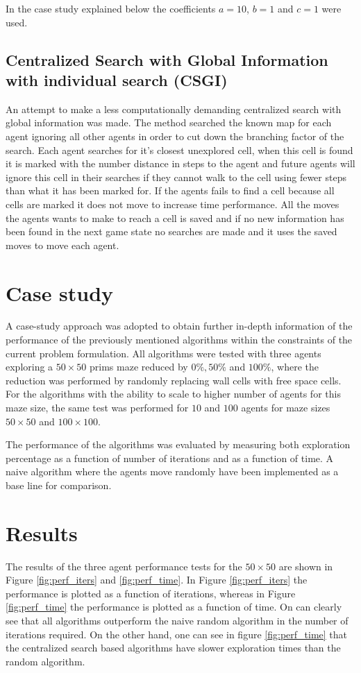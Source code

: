 \documentclass{article}
\begin{document}
In the case study explained below the coefficients $a = 10$, $b = 1$ and $c =
1$ were used.

\subsection{Centralized Search with Global Information with individual search (CSGI)}
An attempt to make a less computationally demanding centralized search with global information was made.
The method searched the known map for each agent ignoring all other agents in order to cut down the branching factor of the search. Each agent searches for it's closest unexplored cell, when this cell is found it is marked with the number distance in steps to the agent and future agents will ignore this cell in their searches if they cannot walk to the cell using fewer steps than what it has been marked for. If the agents fails to find a cell because all cells are marked it does not move to increase time performance. All the moves the agents wants to make to reach a cell is saved and if no new information has been found in the next game state no searches are made and it uses the saved moves to move each agent.

\section{Case study}
A case-study approach was adopted to obtain further in-depth information of the
performance of the previously mentioned algorithms within the constraints of
the current problem formulation. All algorithms were tested with three agents
exploring a $50 \times 50$ prims maze reduced by $0 \%, 50 \% $ and $100\%$, where the
reduction was performed by randomly replacing wall cells with free space cells.
For the algorithms with the ability to scale to higher number of agents for this
maze size, the same test was performed for $10$ and $100$ agents for maze sizes
$50 \times 50$ and $100 \times 100$. 

The performance of the algorithms was evaluated by measuring both exploration
percentage as a function of number of iterations and as a function of time. A
naive algorithm where the agents move randomly have been implemented as a base
line for comparison.


\section{Results}
The results of the three agent performance tests for the $50 \times 50$ are
shown in Figure \ref{fig:perf_iters} and \ref{fig:perf_time}. In Figure
\ref{fig:perf_iters} the performance is plotted as a function of iterations,
whereas in Figure \ref{fig:perf_time} the performance is plotted as a function
of time. On can clearly see that all algorithms outperform the naive random
algorithm in the number of iterations required. On the other hand, one can see
in figure \ref{fig:perf_time} that the centralized search based algorithms have
slower exploration times than the random algorithm.
\end{document}
